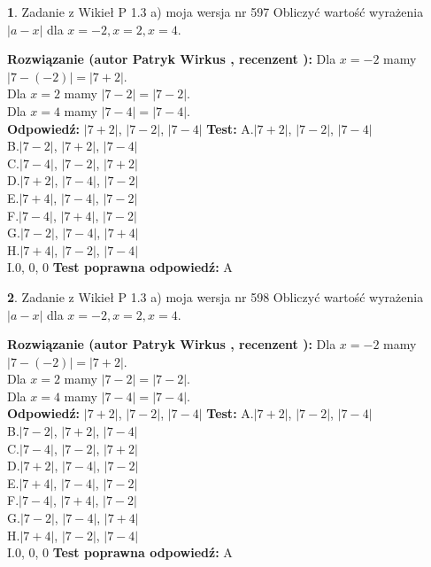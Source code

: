 \documentclass[12pt, a4paper]{article}
\theoremstyle{definition} %
\newtheorem{zad}{}
\newcommand{\zadStart}[1]{\begin{zad}#1\newline}
\newcommand{\zadStop}{\end{zad}}
\newcommand{\rozwStart}[2]{\noindent \textbf{Rozwiązanie (autor #1 , recenzent #2): }\newline}
\newcommand{\rozwStop}{\newline}
\newcommand{\odpStart}{\noindent \textbf{Odpowiedź:}\newline}
\newcommand{\odpStop}{\newline}
\newcommand{\testStart}{\noindent \textbf{Test:}\newline}
\newcommand{\testStop}{\newline}
\newcommand{\kluczStart}{\noindent \textbf{Test poprawna odpowiedź:}\newline}
\newcommand{\kluczStop}{\newline}
\begin{document}
\zadStart{Zadanie z Wikieł P 1.3 a) moja wersja nr 597}
Obliczyć wartość wyrażenia $|a - x|$ dla $x=-2,x=2,x=4$.
\zadStop
\rozwStart{Patryk Wirkus}{}
Dla $x = -2$ mamy $|7 - (-2)| = |7 + 2|$.\\
Dla $x = 2$ mamy $|7 - 2| = |7 - 2|$.\\
Dla $x = 4$ mamy $|7 - 4| = |7 - 4|$.\\
\rozwStop
\odpStart
$|7 + 2|$, $|7 - 2|$, $|7 - 4|$
\odpStop
\testStart
A.$|7 + 2|$, $|7 - 2|$, $|7 - 4|$\\
B.$|7 - 2|$, $|7 + 2|$, $|7 - 4|$\\
C.$|7 - 4|$, $|7 - 2|$, $|7 + 2|$\\
D.$|7 + 2|$, $|7 - 4|$, $|7 - 2|$\\
E.$|7 + 4|$, $|7 - 4|$, $|7 - 2|$\\
F.$|7 - 4|$, $|7 + 4|$, $|7 - 2|$\\
G.$|7 - 2|$, $|7 - 4|$, $|7 + 4|$\\
H.$|7 + 4|$, $|7 - 2|$, $|7 - 4|$\\
I.$0$, $0$, $0$
\testStop
\kluczStart
A
\kluczStop



\zadStart{Zadanie z Wikieł P 1.3 a) moja wersja nr 598}
Obliczyć wartość wyrażenia $|a - x|$ dla $x=-2,x=2,x=4$.
\zadStop
\rozwStart{Patryk Wirkus}{}
Dla $x = -2$ mamy $|7 - (-2)| = |7 + 2|$.\\
Dla $x = 2$ mamy $|7 - 2| = |7 - 2|$.\\
Dla $x = 4$ mamy $|7 - 4| = |7 - 4|$.\\
\rozwStop
\odpStart
$|7 + 2|$, $|7 - 2|$, $|7 - 4|$
\odpStop
\testStart
A.$|7 + 2|$, $|7 - 2|$, $|7 - 4|$\\
B.$|7 - 2|$, $|7 + 2|$, $|7 - 4|$\\
C.$|7 - 4|$, $|7 - 2|$, $|7 + 2|$\\
D.$|7 + 2|$, $|7 - 4|$, $|7 - 2|$\\
E.$|7 + 4|$, $|7 - 4|$, $|7 - 2|$\\
F.$|7 - 4|$, $|7 + 4|$, $|7 - 2|$\\
G.$|7 - 2|$, $|7 - 4|$, $|7 + 4|$\\
H.$|7 + 4|$, $|7 - 2|$, $|7 - 4|$\\
I.$0$, $0$, $0$
\testStop
\kluczStart
A
\kluczStop
\end{document}
